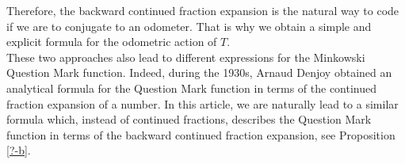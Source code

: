 \documentclass[letterpaper,10pt,reqno]{amsart}
\numberwithin{equation}{section}     %
\def\Q{{\mathbb Q}}
\begin{document}
{{}{T}}herefore, the backward continued fraction expansion is the natural way to code if we are to conjugate to an odometer. That is why we obtain a simple and explicit formula for the odometric action of $T$.\\ 

 These two approaches also lead to different expressions for the Minkowski Question Mark function. Indeed, during the 1930s, Arnaud Denjoy \cite{d1,d2} obtained an analytical formula for the Question Mark function in terms of the continued fraction expansion of a number. In this article, we are naturally lead to a similar formula which, instead of continued fractions, describes the Question Mark function in terms of the backward continued fraction expansion, see Proposition \ref{?-b}.




%
% 
% 
 
\end{document}
